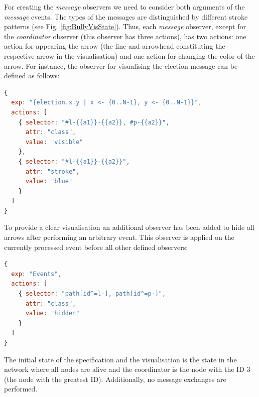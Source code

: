 For creating the \textit{message} observers we need to consider both arguments of the \textit{message} events.
The types of the messages are distinguished by different stroke patterns (see Fig. \ref{fig:BullyVisState}).
Thus, each \textit{message} observer, except for the \textit{coordinator} observer (this observer has three actions), has two actions: one action for appearing the arrow (the line and arrowhead constituting the respective arrow in the visualisation) and one action for changing the color of the arrow.
For instance, the observer for visualising the election message can be defined as follows:

\begin{lstlisting}[language=JavaScript]
{
  exp: "{election.x.y | x <- {0..N-1}, y <- {0..N-1}}",
  actions: [
    { selector: "#l-{{a1}}-{{a2}}, #p-{{a2}}",
      attr: "class",
      value: "visible"
    },
    { selector: "#l-{{a1}}-{{a2}}",
      attr: "stroke",
      value: "blue"
    }
  ]
}
\end{lstlisting}

To provide a clear visualisation an additional observer has been added to hide all arrows after performing an arbitrary event.
This observer is applied on the currently processed event before all other defined observers:

\begin{lstlisting}[language=JavaScript]
{
  exp: "Events",
  actions: [
    { selector: "path[id^=l-], path[id^=p-]", 
      attr: "class", 
      value: "hidden"
    }
  ]
}
\end{lstlisting}
 
The initial state of the specification and the visualisation is the state in the network where all nodes are alive and the coordinator is the node with the ID 3 (the node with the greatest ID). 
Additionally, no message exchanges are performed.
